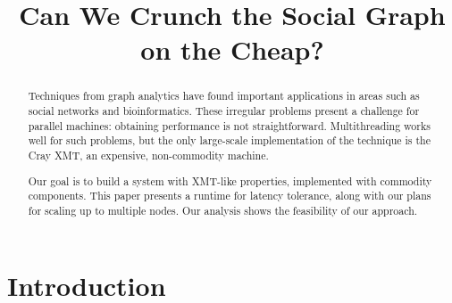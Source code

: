 \documentclass[10pt,nocopyrightspace,preprint]{sigplanconf}
\begin{document}
\title{Can We Crunch the Social Graph on the Cheap?}




\maketitle
\begin{abstract}

 Techniques from graph analytics have found important applications in
  areas such as social networks and bioinformatics. These irregular
  problems present a challenge for parallel machines: obtaining
  performance is not straightforward. Multithreading works well for
  such problems, but the only large-scale implementation of the technique
  is the Cray XMT, an expensive, non-commodity machine.

  Our goal is to build a system with XMT-like properties, implemented
  with commodity components. This paper presents a runtime for latency
  tolerance, along with our plans for scaling up to multiple
  nodes. Our analysis shows the feasibility of our approach.
\end{abstract}

\section{Introduction}
\end{document}
